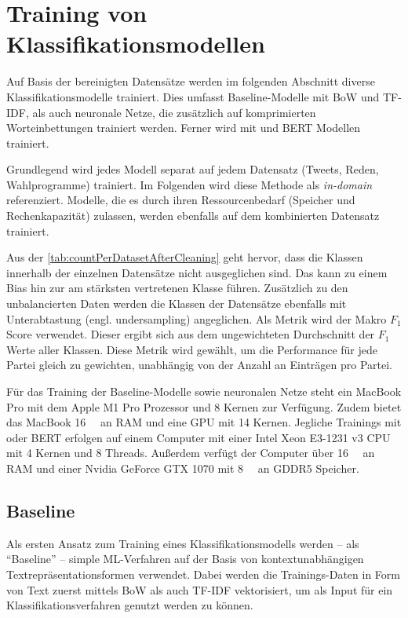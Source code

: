 
\chapter{Training von Klassifikationsmodellen} \label{ch:crispDm_2}

Auf Basis der bereinigten Datensätze werden im folgenden Abschnitt diverse Klassifikationsmodelle trainiert. Dies umfasst Baseline-Modelle mit \ac{BoW} und \ac{TF-IDF}, als auch neuronale Netze, die zusätzlich auf komprimierten Worteinbettungen trainiert werden. Ferner wird mit \ft und \ac{BERT} Modellen trainiert.

Grundlegend wird jedes Modell separat auf jedem Datensatz (Tweets, Reden, Wahlprogramme) trainiert. Im Folgenden wird diese Methode als \textit{in-domain} referenziert. Modelle, die es durch ihren Ressourcenbedarf (Speicher und Rechenkapazität) zulassen, werden ebenfalls auf dem kombinierten Datensatz trainiert.

Aus der \autoref{tab:countPerDatasetAfterCleaning} geht hervor, dass die Klassen innerhalb der einzelnen Datensätze nicht ausgeglichen sind. Das kann zu einem Bias hin zur am stärksten vertretenen Klasse führen. Zusätzlich zu den unbalancierten Daten werden die Klassen der Datensätze ebenfalls mit Unterabtastung (engl. undersampling) angeglichen. Als Metrik wird der Makro \(F_1\) Score verwendet. Dieser ergibt sich aus dem ungewichteten Durchschnitt der \(F_1\) Werte aller Klassen. Diese Metrik wird gewählt, um die Performance für jede Partei gleich zu gewichten, unabhängig von der Anzahl an Einträgen pro Partei.

Für das Training der Baseline-Modelle sowie neuronalen Netze steht ein MacBook Pro mit dem Apple M1 Pro Prozessor und \num{8} Kernen zur Verfügung. Zudem bietet das MacBook \SI{16}{\giga\byte} an \ac{RAM} und eine \ac{GPU} mit \num{14} Kernen. Jegliche Trainings mit \ft oder \ac{BERT} erfolgen auf einem Computer mit einer Intel Xeon E3-1231 v3 \ac{CPU} mit \num{4} Kernen und \num{8} Threads. Außerdem verfügt der Computer über \SI{16}{\giga\byte} an \ac{RAM} und einer Nvidia GeForce GTX 1070 mit \SI{8}{\giga\byte} an \ac{GDDR5} Speicher.

\section{Baseline} \label{sec:trainingBaseline}

Als ersten Ansatz zum Training eines Klassifikationsmodells werden -- als \enquote{Baseline} -- simple \ac{ML}-Verfahren auf der Basis von kontextunabhängigen Textrepräsentationsformen verwendet. Dabei werden die Trainings-Daten in Form von Text zuerst mittels \ac{BoW} als auch \ac{TF-IDF} vektorisiert, um als Input für ein Klassifikationsverfahren genutzt werden zu können.

